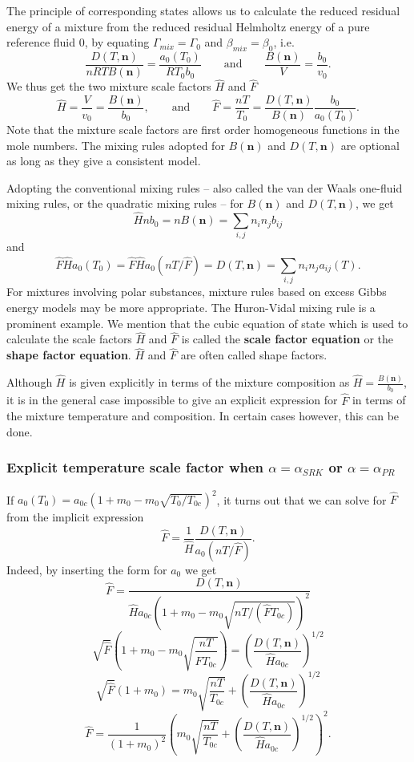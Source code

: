 \documentclass[internal,english]{sintefmemo2012}
\newcommand{\mbn}[0]{\mathbf n}
\newcommand*{\hF}[0]{\hat F}
\newcommand*{\hH}[0]{\hat H}
\newcommand{\lp}{\left(}
\newcommand{\rp}{\right)}
\numberwithin{equation}{section}
\begin{document}
The principle of corresponding states allows us to calculate the
reduced residual energy of a mixture from the reduced residual
Helmholtz energy of a pure reference fluid $0$, by equating $\Gamma_{mix} =
\Gamma_0$ and $\beta_{mix} = \beta_0$, i.e.
$$
\frac{D(T,\mbn)}{nRTB(\mbn)} = \frac{a_0(T_0)}{RT_0b_0} \qquad \text{and} \qquad
\frac{B(\mbn)}{V} = \frac{b_0}{v_0}.
$$
We thus get the two mixture scale factors $\hat H$ and $\hat F$
$$
\hat H = \frac{V}{v_0} = \frac{B(\mbn)}{b_0}, \qquad \text{and} \qquad \hat
F = \frac{nT}{T_0} = \frac{D(T,\mbn)}{B(\mbn)} \frac{b_0}{a_0(T_0)}.
$$
Note that the mixture scale factors are first order homogeneous
functions in the mole numbers. The mixing rules
adopted for $B(\mbn)$ and $D(T,\mbn)$ are optional as long as they give a consistent
model. %

Adopting the conventional mixing rules -- also called the van der Waals
one-fluid mixing rules, or the quadratic mixing rules -- for $B(\mbn)$ and $D(T,\mbn)$, we get
$$
\hat H n b_0 = nB(\mbn) = \sum_{i,j} n_i n_j b_{ij}
$$
and
$$
\hat F \hat H a_0(T_0) = \hat F \hat H a_0(nT/\hat F) = D(T,\mbn) = \sum_{i,j}
n_i n_j a_{ij}(T).
$$
For mixtures involving polar substances, mixture rules based on excess
Gibbs energy models may be more appropriate. The Huron-Vidal mixing
rule is a prominent example. We mention that the cubic equation of state which is used to calculate the scale
factors $\hH$ and $\hF$ is called the \textbf{scale factor equation}
or the \textbf{shape factor equation}. $\hH$ and $\hF$ are often
called shape factors.

Although $\hH$ is given explicitly in terms of the mixture composition
as $\hat H = \frac{B(\mbn)}{b_0}$, it is in the general case
impossible to give an explicit expression for $\hF$ in terms of the
mixture temperature and composition. In certain cases however, this
can be done.

\subsubsection*{Explicit temperature scale factor when $\alpha=\alpha_{SRK}$ or $\alpha=\alpha_{PR}$}
If $a_0(T_0) = a_{0c} (1+m_0-m_0 \sqrt{T_0/T_{0c}})^2$, it
turns out that we can solve for $\hF$ from the implicit expression
$$
\hat F =  \frac{1}{\hH} \frac{D(T,\mbn)}{a_0(nT/\hF)}.
$$
Indeed, by inserting the form for $a_0$ we get
$$
\hat F = \frac{D(T,\mbn)}{\hH a_{0c} \lp 1+m_0-m_0 \sqrt{nT/(\hF T_{0c})} \rp^2}
$$
$$
\sqrt{\hat F} \lp 1+m_0-m_0 \sqrt{\frac{nT}{\hF T_{0c}}}\rp = \lp
\frac{D(T,\mbn)}{\hH a_{0c}} \rp^{1/2}
$$
$$
\sqrt{\hat F} (1+m_0) = m_0 \sqrt{\frac{nT}{T_{0c}}} +  \lp
\frac{D(T,\mbn)}{\hH a_{0c}} \rp^{1/2}
$$
\begin{equation}
  \label{hF_SRK}
  \hat F = \frac{1}{(1+m_0)^2}\lp m_0 \sqrt{\frac{nT}{T_{0c}}} + \lp
  \frac{D(T,\mbn)}{\hH a_{0c}} \rp^{1/2} \rp^2.
\end{equation}
\end{document}
